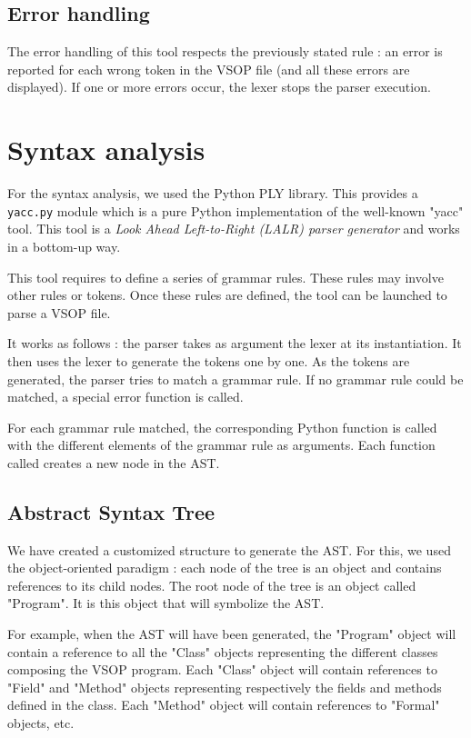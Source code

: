 \documentclass[a4paper, 12pt]{article}
\begin{document}
    \subsection{Error handling}
    
    The error handling of this tool respects the previously stated rule : an error is reported for each wrong token in the VSOP file (and all these errors are displayed). If one or more errors occur, the lexer stops the parser execution.
    
    
    \section{Syntax analysis}
    
    For the syntax analysis, we used the Python PLY library. This provides a \texttt{yacc.py} module which is a pure Python implementation of the well-known "yacc" tool. This tool is a {\it Look Ahead Left-to-Right (LALR) parser generator} and works in a bottom-up way.
    
    This tool requires to define a series of grammar rules. These rules may involve other rules or tokens. Once these rules are defined, the tool can be launched to parse a VSOP file.
    
    It works as follows : the parser takes as argument the lexer at its instantiation. It then uses the lexer to generate the tokens one by one. As the tokens are generated, the parser tries to match a grammar rule. If no grammar rule could be matched, a special error function is called.
    
    For each grammar rule matched, the corresponding Python function is called with the different elements of the grammar rule as arguments. Each function called creates a new node in the AST.
    
    \subsection{Abstract Syntax Tree}
    
    We have created a customized structure to generate the AST. For this, we used the object-oriented paradigm : each node of the tree is an object and contains references to its child nodes. The root node of the tree is an object called "Program". It is this object that will symbolize the AST.
    
    For example, when the AST will have been generated, the "Program" object will contain a reference to all the "Class" objects representing the different classes composing the VSOP program. Each "Class" object will contain references to "Field" and "Method" objects representing respectively the fields and methods defined in the class. Each "Method" object will contain references to "Formal" objects, etc.
    
\end{document}
